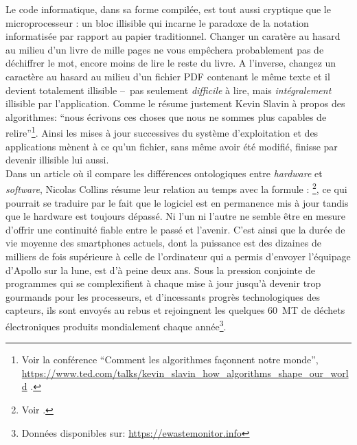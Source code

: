 \indent Le code informatique, dans sa forme compilée, est tout aussi cryptique que le microprocesseur : un bloc illisible qui incarne le paradoxe de la notation informatisée par rapport au papier traditionnel. Changer un caratère au hasard au milieu d'un livre de mille pages ne vous empêchera probablement pas de déchiffrer le mot, encore moins de lire le reste du livre. A l'inverse, changez un caractère au hasard au milieu d'un fichier PDF contenant le même texte et il devient totalement illisible --~pas seulement \textit{difficile} à lire, mais \textit{intégralement} illisible par l'application. Comme le résume justement Kevin Slavin à propos des algorithmes: ``nous écrivons ces choses que nous ne sommes plus capables de relire''\footnote{Voir la conférence ``Comment les algorithmes façonnent notre monde'', \url{https://www.ted.com/talks/kevin_slavin_how_algorithms_shape_our_world} \cite{slavin_how_2011}.}. Ainsi les mises à jour successives du système d'exploitation et des applications mènent à ce qu'un fichier, sans même avoir été modifié, finisse par devenir illisible lui aussi.\\
\indent Dans un article où il compare les différences ontologiques entre \textit{hardware} et \textit{software}, Nicolas Collins résume leur relation au temps avec la formule : \footnote{Voir \cite{collins_semiconducting_2013}.}, ce qui pourrait se traduire par le fait que le logiciel est en permanence mis à jour tandis que le hardware est toujours dépassé. Ni l'un ni l'autre ne semble être en mesure d'offrir une continuité fiable entre le passé et l'avenir. C'est ainsi que la durée de vie moyenne des smartphones actuels, dont la puissance est des dizaines de milliers de fois supérieure à celle de l'ordinateur qui a permis d'envoyer l'équipage d'Apollo sur la lune, est d'à peine deux ans. Sous la pression conjointe de programmes qui se complexifient à chaque mise à jour jusqu'à devenir trop gourmands pour les processeurs, et d'incessants progrès technologiques des capteurs, ils sont envoyés au rebus et rejoingnent les quelques 60~MT de déchets électroniques produits mondialement chaque année\footnote{Données disponibles sur: \url{https://ewastemonitor.info}}.


